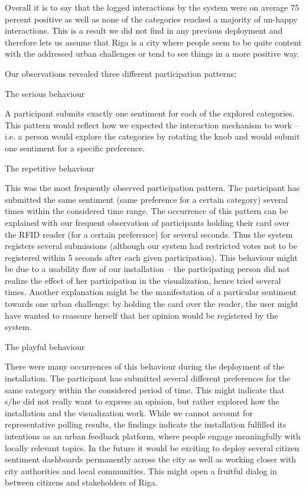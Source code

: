 Overall it is to say that the logged interactions by the system were on average 75 percent positive as well as none of the categories reached a majority of un-happy interactions. This is a result we did not find in any previous deployment and therefore lets us assume that Riga is a city where people seem to be quite content with the addressed urban challenges or tend to see things in a more positive way.

Our observations revealed three different participation patterns:

The serious behaviour

A participant submits exactly one sentiment for each of the explored categories. This pattern would reflect how we expected the interaction mechanism to work – i.e. a person would explore the categories by rotating the knob and would submit one sentiment for a specific preference.

The repetitive behaviour

This was the most frequently observed participation pattern. The participant has submitted the same sentiment (same preference for a certain category) several times within the considered time range. The occurrence of this pattern can be explained with our frequent observation of participants holding their card over the RFID reader (for a certain preference) for several seconds. Thus the system registers several submissions (although our system had restricted votes not to be registered within 5 seconds after each given participation). This behaviour might be due to a usability flaw of our installation – the participating person did not realize the effect of her participation in the visualization, hence tried several times. Another explanation might be the manifestation of a particular sentiment towards one urban challenge: by holding the card over the reader, the user might have wanted to reassure herself that her opinion would be registered by the system.

The playful behaviour

There were many occurrences of this behaviour during the deployment of the installation. The participant has submitted several different preferences for the same category within the considered period of time. This might indicate that s/he did not really want to express an opinion, but rather explored how the installation and the visualization work. While we cannot account for representative polling results, the findings indicate the installation fulfilled its intentions as an urban feedback platform, where people engage meaningfully with locally relevant topics. In the future it would be exciting to deploy several citizen sentiment dashboards permanently across the city as well as working closer with city authorities and local communities. This might open a fruitful dialog in between citizens and stakeholders of Riga.

